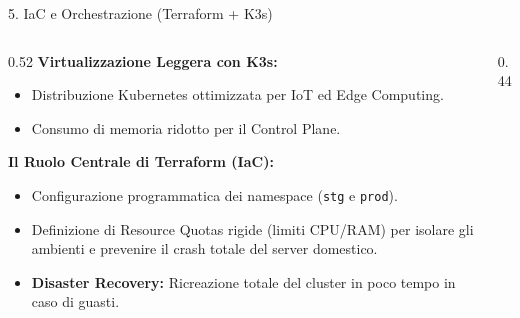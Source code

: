 \documentclass[aspectratio=169, 10pt]{beamer}
\begin{document}
\begin{frame}{5. IaC e Orchestrazione (Terraform + K3s)}
  \begin{columns}
    \begin{column}{0.52\textwidth}
      \textbf{Virtualizzazione Leggera con K3s:}
      \begin{itemize}
        \item Distribuzione Kubernetes ottimizzata per IoT ed Edge Computing.
        \item Consumo di memoria ridotto per il Control Plane.
      \end{itemize}
      \vspace{0.3cm}
      \textbf{Il Ruolo Centrale di Terraform (IaC):}
      \begin{itemize}
        \item Configurazione programmatica dei namespace (\texttt{stg} e \texttt{prod}).
        \item Definizione di \alert{Resource Quotas} rigide (limiti CPU/RAM) per isolare gli ambienti e prevenire il crash totale del server domestico.
        \item \textbf{Disaster Recovery:} Ricreazione totale del cluster in poco tempo in caso di guasti.
      \end{itemize}
    \end{column}
    \begin{column}{0.44\textwidth}
      \begin{tcolorbox}[colback=karateDark!5, colframe=karateDark, title=Resource Isolation Framework, left=1mm, right=1mm, top=1mm, bottom=1mm]
        \centering
        \scriptsize
      \end{tcolorbox}
    \end{column}
  \end{columns}
\end{frame}
\end{document}
